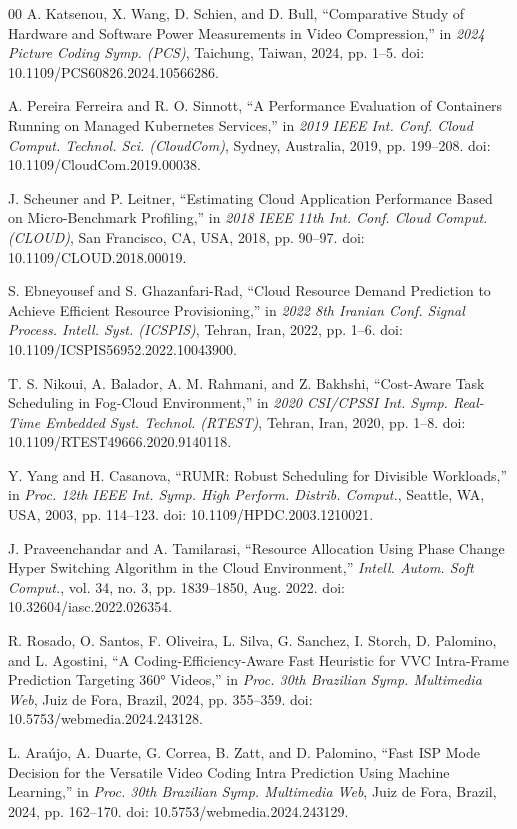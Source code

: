 \documentclass[conference]{IEEEtran}
\begin{document}
\begin{thebibliography}{00}
		 A. Katsenou, X. Wang, D. Schien, and D. Bull, ``Comparative Study of Hardware and Software Power Measurements in Video Compression,'' in \emph{2024 Picture Coding Symp. (PCS)}, Taichung, Taiwan, 2024, pp. 1--5. doi: 10.1109/PCS60826.2024.10566286.
		
		 A. Pereira Ferreira and R. O. Sinnott, ``A Performance Evaluation of Containers Running on Managed Kubernetes Services,'' in \emph{2019 IEEE Int. Conf. Cloud Comput. Technol. Sci. (CloudCom)}, Sydney, Australia, 2019, pp. 199--208. doi: 10.1109/CloudCom.2019.00038.
		
		 J. Scheuner and P. Leitner, ``Estimating Cloud Application Performance Based on Micro-Benchmark Profiling,'' in \emph{2018 IEEE 11th Int. Conf. Cloud Comput. (CLOUD)}, San Francisco, CA, USA, 2018, pp. 90--97. doi: 10.1109/CLOUD.2018.00019.
		
		 S. Ebneyousef and S. Ghazanfari-Rad, ``Cloud Resource Demand Prediction to Achieve Efficient Resource Provisioning,'' in \emph{2022 8th Iranian Conf. Signal Process. Intell. Syst. (ICSPIS)}, Tehran, Iran, 2022, pp. 1--6. doi: 10.1109/ICSPIS56952.2022.10043900.
		
		 T. S. Nikoui, A. Balador, A. M. Rahmani, and Z. Bakhshi, ``Cost-Aware Task Scheduling in Fog-Cloud Environment,'' in \emph{2020 CSI/CPSSI Int. Symp. Real-Time Embedded Syst. Technol. (RTEST)}, Tehran, Iran, 2020, pp. 1--8. doi: 10.1109/RTEST49666.2020.9140118.
		
		 Y. Yang and H. Casanova, ``RUMR: Robust Scheduling for Divisible Workloads,'' in \emph{Proc. 12th IEEE Int. Symp. High Perform. Distrib. Comput.}, Seattle, WA, USA, 2003, pp. 114--123. doi: 10.1109/HPDC.2003.1210021.
		
		 J. Praveenchandar and A. Tamilarasi, ``Resource Allocation Using Phase Change Hyper Switching Algorithm in the Cloud Environment,'' \emph{Intell. Autom. Soft Comput.}, vol. 34, no. 3, pp. 1839--1850, Aug. 2022. doi: 10.32604/iasc.2022.026354.
		
		 R. Rosado, O. Santos, F. Oliveira, L. Silva, G. Sanchez, I. Storch, D. Palomino, and L. Agostini, ``A Coding-Efficiency-Aware Fast Heuristic for VVC Intra-Frame Prediction Targeting 360° Videos,'' in \emph{Proc. 30th Brazilian Symp. Multimedia Web}, Juiz de Fora, Brazil, 2024, pp. 355--359. doi: 10.5753/webmedia.2024.243128.
		
		 L. Araújo, A. Duarte, G. Correa, B. Zatt, and D. Palomino, ``Fast ISP Mode Decision for the Versatile Video Coding Intra Prediction Using Machine Learning,'' in \emph{Proc. 30th Brazilian Symp. Multimedia Web}, Juiz de Fora, Brazil, 2024, pp. 162--170. doi: 10.5753/webmedia.2024.243129.
		

\end{thebibliography}
\end{document}
